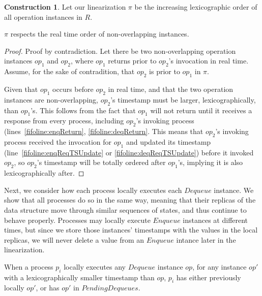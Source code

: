 \documentclass[a4paper,anonymous,USenglish]{lipics-v2021} %
\theoremstyle{definition}
\newtheorem{construction}{Construction}
\begin{document}
\begin{construction}\label{constr:fifo}
  Let our linearization $\pi$ be the increasing lexicographic order of all operation instances in $R$.
\end{construction}

\begin{lemma}\label{fifolem:realTimeOrder}
  $\pi$ respects the real time order of non-overlapping instances.
\end{lemma}
\begin{proof}
  Proof by contradiction. Let there be two non-overlapping operation instances $op_1$ and $op_2$, where $op_1$ returns prior to $op_2$'s invocation in real time.  Assume, for the sake of contradition, that $op_2$ is prior to $op_1$ in $\pi$.
  
  Given that $op_1$ occurs before $op_2$ in real time, and that the two operation instances are non-overlapping, $op_2$'s timestamp must be larger, lexicographically, than $op_1$'s.  This follows from the fact that $op_1$ will not return until it receives a response from every process, including $op_2$'s invoking process (lines~\ref{fifoline:enqReturn}, \ref{fifoline:deqReturn}.  This means that $op_2$'s invoking process received the invocation for $op_1$ and updated its timestamp (line~\ref{fifoline:enqReqTSUpdate} or \ref{fifoline:deqReqTSUpdate}) before it invoked $op_2$, so $op_2$'s timestamp will be totally ordered after $op_1$'s, implying it is also lexicographically after.
\end{proof}

Next, we consider how each process locally executes each $Dequeue$ instance.  We show that all processes do so in the same way, meaning that their replicas of the data structure move through similar sequences of states, and thus continue to behave properly.  Processes may locally execute $Enqueue$ instances at different times, but since we store those instances' timestamps with the values in the local replicas, we will never delete a value from an $Enqueue$ intance later in the linearization.

\begin{lemma}\label{fifolem:prevLocalExec}
  When a process $p_i$ locally executes any $Dequeue$ instance $op$, for any instance $op'$ with a lexicographically smaller timestamp than $op$, $p_i$ has either previously locally $op'$, or has $op'$ in $PendingDequeues$.
\end{lemma}
\end{document}
